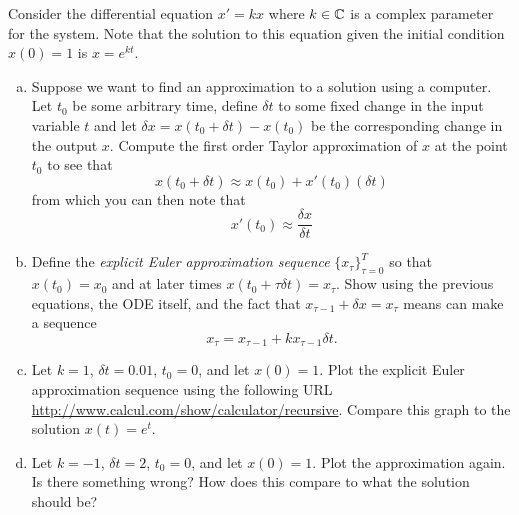\documentclass[12pt]{article} %
\begin{document}
\newpage
\begin{problem}
	Consider the differential equation $x'=kx$ where $k\in \mathbb{C}$ is a complex parameter for the system. Note that the solution to this equation given the initial condition $x(0)=1$ is $x=e^{kt}$. 
	\begin{enumerate}[(a)]
		\item Suppose we want to find an approximation to a solution using a computer. Let $t_0$ be some arbitrary time, define $\delta t$ to some fixed change in the input variable $t$ and let $\delta x =x(t_0+\delta t)-x(t_0)$ be the corresponding change in the output $x$. Compute the first order Taylor approximation of $x$ at the point $t_0$ to see that
		\begin{equation}
			\label{eq:1}
			x(t_0+\delta t) \approx x(t_0)+x'(t_0)(\delta t)
		\end{equation}
		from which you can then note that
		\begin{equation}
			\label{eq:2}
			x'(t_0) \approx \frac{\delta x}{\delta t}
		\end{equation}
		\item Define the \emph{explicit Euler approximation sequence} $\{x_\tau\}_{\tau=0}^T$ so that $x(t_0)=x_0$ and at later times $x(t_0+\tau\delta t)=x_\tau$. Show using the previous equations, the ODE itself, and the fact that $x_{\tau-1}+\delta x = x_{\tau}$ means can make a sequence
		\[
		x_{\tau} = x_{\tau-1} + kx_{\tau-1} \delta t.
		\]
		\item Let $k=1$, $\delta t = 0.01$, $t_0=0$, and let $x(0)=1$. Plot the explicit Euler approximation sequence using the following URL \url{http://www.calcul.com/show/calculator/recursive}. Compare this graph to the solution $x(t)=e^{t}$.
		\item Let $k=-1$, $\delta t = 2$, $t_0=0$, and let $x(0)=1$. Plot the approximation again. Is there something wrong? How does this compare to what the solution should be?
	\end{enumerate}
\end{problem}
\end{document}
